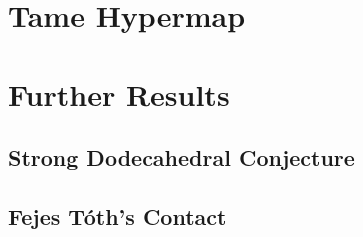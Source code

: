 %
%




\chapter{Tame Hypermap}

\chapter{Further Results}

\section{Strong Dodecahedral Conjecture}

\section{Fejes T\'oth's Contact}

